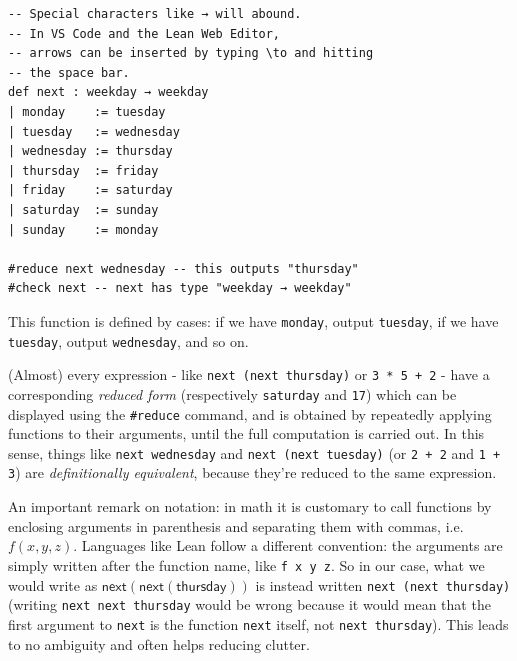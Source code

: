 \documentclass{book}
\theoremstyle{definition}
\theoremstyle{remark}
\theoremstyle{plain}
\begin{document}
\begin{lstlisting}
-- Special characters like → will abound.
-- In VS Code and the Lean Web Editor,
-- arrows can be inserted by typing \to and hitting
-- the space bar. 
def next : weekday → weekday
| monday    := tuesday
| tuesday   := wednesday
| wednesday := thursday
| thursday  := friday
| friday    := saturday
| saturday  := sunday
| sunday    := monday

#reduce next wednesday -- this outputs "thursday"
#check next -- next has type "weekday → weekday"
\end{lstlisting}
This function is defined by cases:
if we have \lstinline{monday}, output \lstinline{tuesday},
if we have \lstinline{tuesday}, output \lstinline{wednesday}, and so on.

(Almost) every expression - like \lstinline{next (next thursday)} or \lstinline{3 * 5 + 2} -
have a corresponding \textit{reduced form} (respectively \lstinline{saturday} and \lstinline{17})
which can be displayed using the \lstinline{#reduce} command,
and is obtained by repeatedly applying functions to their arguments, until the full computation is carried out.
In this sense, things like \lstinline{next wednesday} and \lstinline{next (next tuesday)}
(or \lstinline{2 + 2} and \lstinline{1 + 3}) are \textit{definitionally equivalent}, because they're reduced to the same expression.

An important remark on notation:
in math it is customary to call functions by enclosing arguments in parenthesis and separating them with commas, i.e. $f(x,y,z)$.
Languages like Lean follow a different convention: the arguments are simply written after the function name, like \lstinline{f x y z}.
So in our case, what we would write as $\mathsf{next(next(thursday))}$ is instead written \lstinline{next (next thursday)}
(writing \lstinline{next next thursday} would be wrong
because it would mean that the first argument to \lstinline{next} is the function \lstinline{next} itself, not \lstinline{next thursday}).
This leads to no ambiguity and often helps reducing clutter.
\end{document}
